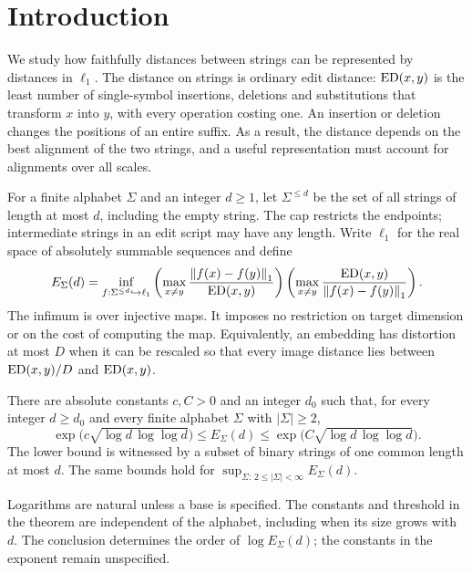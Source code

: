 \section{Introduction}

We study how faithfully distances between strings can be represented by
distances in $\ell_1$. The distance on strings is ordinary edit distance:
$\operatorname{ED}(x,y)$ is the least number of single-symbol insertions, deletions and
substitutions that transform $x$ into $y$, with every operation costing
one. An insertion or deletion changes the positions of an entire suffix.
As a result, the distance depends on the best alignment of the two strings,
and a useful representation must account for alignments over all scales.

For a finite alphabet $\Sigma$ and an integer $d\ge1$, let
$\Sigma^{\le d}$ be the set of all strings of length at most $d$, including
the empty string. The cap restricts the endpoints; intermediate strings
in an edit script may have any length. Write $\ell_1$ for the real space of
absolutely summable sequences and define
\[
 E_\Sigma(d)=
 \inf_{f:\Sigma^{\le d}\hookrightarrow\ell_1}
 \left(\max_{x\ne y}\frac{\left\lVert f(x)-f(y)\right\rVert_1}{\operatorname{ED}(x,y)}\right)
 \left(\max_{x\ne y}\frac{\operatorname{ED}(x,y)}{\left\lVert f(x)-f(y)\right\rVert_1}\right).
\]
The infimum is over injective maps. It imposes no restriction on target
dimension or on the cost of computing the map. Equivalently, an embedding
has distortion at most $D$ when it can be rescaled so that every image
distance lies between $\operatorname{ED}(x,y)/D$ and $\operatorname{ED}(x,y)$.

\begin{theorem}\label{thm:main}
There are absolute constants $c,C>0$ and an integer $d_0$ such that, for
every integer $d\ge d_0$ and every finite alphabet $\Sigma$ with
$|\Sigma|\ge2$,
\begin{equation}\label{eq:main}
 \exp\!\bigl(c\sqrt{\log d\,\log\log d}\bigr)
 \le E_\Sigma(d)\le
 \exp\!\bigl(C\sqrt{\log d\,\log\log d}\bigr).
\end{equation}
The lower bound is witnessed by a subset of binary strings of one common
length at most $d$. The same bounds hold for
$\sup_{\Sigma:\,2\le|\Sigma|<\infty}E_\Sigma(d)$.
\end{theorem}

Logarithms are natural unless a base is specified. The constants and
threshold in the theorem are independent of the alphabet, including when
its size grows with $d$. The conclusion determines the order of
$\log E_\Sigma(d)$; the constants in the exponent remain unspecified.

